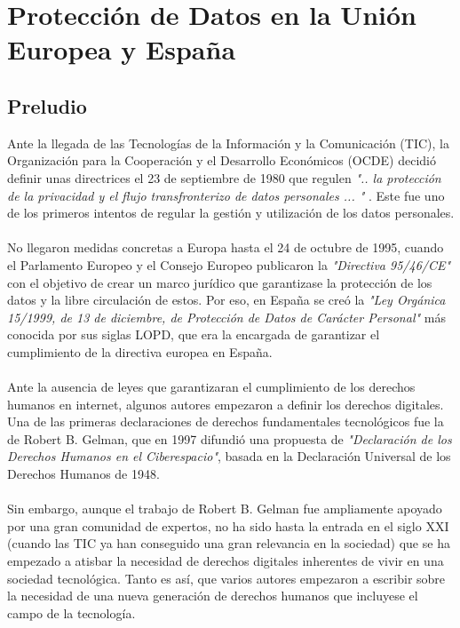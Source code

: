 \appendix

\chapter{Protección de Datos en la Unión Europea y España}\label{appendix:ProteccionDatos}
\thispagestyle{fancy}
\begin{refsection}

\section{Preludio}
Ante la llegada de las Tecnologías de la Información y la Comunicación (TIC), la Organización para la Cooperación y el Desarrollo Económicos (OCDE) decidió definir unas directrices el 23 de septiembre de 1980 que regulen \textit{".. la protección de la privacidad y el flujo transfronterizo de datos personales ... "} \autocite[]{oecdOECDGuidelinesProtection2002}. Este fue uno de los primeros intentos de regular la gestión y utilización de los datos personales.
\\ \\
No llegaron medidas concretas a Europa hasta el 24 de octubre de 1995, cuando el Parlamento Europeo y el Consejo Europeo publicaron la \textit{"Directiva 95/46/CE"} \autocite{DIRECTIVA9546} con el objetivo de crear un marco jurídico que garantizase la protección de los datos y la libre circulación de estos. Por eso, en España se creó la \textit{"Ley Orgánica 15/1999, de 13 de diciembre, de Protección de Datos de Carácter Personal"} \autocite{LEYORGANICA15} más conocida por sus siglas LOPD, que era la encargada de garantizar el cumplimiento de la directiva europea en España. 
\\ \\
Ante la ausencia de leyes que garantizaran el cumplimiento de los derechos humanos en internet, algunos autores empezaron a definir los derechos digitales. Una de las primeras declaraciones de derechos fundamentales tecnológicos fue la de Robert B. Gelman, que en 1997 difundió una propuesta de \textit{"Declaración de los Derechos Humanos en el Ciberespacio"}, basada en la Declaración Universal de los Derechos Humanos de 1948.
\\ \\
Sin embargo, aunque el trabajo de Robert B. Gelman fue ampliamente apoyado por una gran comunidad de expertos, no ha sido hasta la entrada en el siglo XXI (cuando las TIC ya han conseguido una gran relevancia en la sociedad) que se ha empezado a atisbar la necesidad de derechos digitales inherentes de vivir en una sociedad tecnológica. Tanto es así, que varios autores empezaron a escribir sobre la necesidad de una nueva generación de derechos humanos que incluyese el campo de la tecnología.

\end{refsection}
